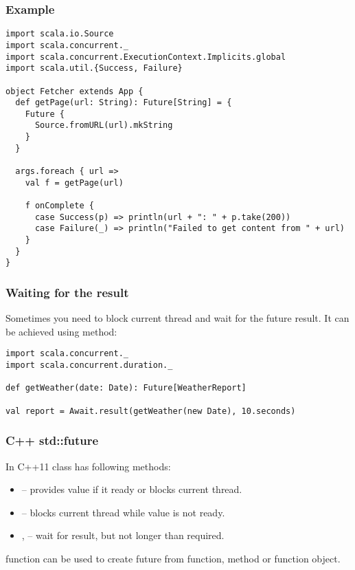 \documentclass{beamer}
\begin{document}
\begin{frame}[fragile]
\frametitle{Example}
\begin{lstlisting}
import scala.io.Source
import scala.concurrent._
import scala.concurrent.ExecutionContext.Implicits.global
import scala.util.{Success, Failure}

object Fetcher extends App {
  def getPage(url: String): Future[String] = {
    Future {
      Source.fromURL(url).mkString
    }
  }

  args.foreach { url =>
    val f = getPage(url)

    f onComplete {
      case Success(p) => println(url + ": " + p.take(200))
      case Failure(_) => println("Failed to get content from " + url)
    }
  }
}
\end{lstlisting}
\end{frame}

\begin{frame}[fragile]
\frametitle{Waiting for the result}
Sometimes you need to block current thread and wait for the future result.
It can be achieved using  method:
\begin{example}
\begin{lstlisting}
import scala.concurrent._
import scala.concurrent.duration._

def getWeather(date: Date): Future[WeatherReport]

val report = Await.result(getWeather(new Date), 10.seconds)
\end{lstlisting}
\end{example}

\end{frame}

\begin{frame}[fragile]
\frametitle{C++ std::future}
In C++11  class has following methods:
\begin{itemize}
\item {} -- provides value if it ready or blocks current thread.
\item {} -- blocks current thread while value is not ready.
\item {},  -- wait for result, but not longer than
required.
\end{itemize}
 function can be used to create future from function, method or function object.
\end{frame}
\end{document}
